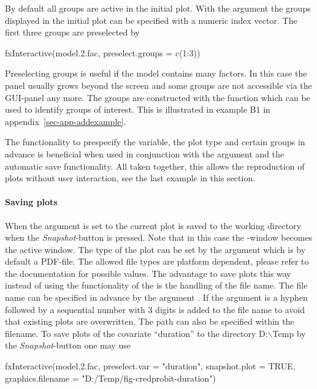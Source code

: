 \documentclass[nojss]{jss}
\newcommand{\quotes}[1]{``#1''}
\begin{document}
By default all groups are active in the initial plot. With the argument  the groups  displayed in the initial plot can be specified with a 
numeric index vector. The first three groups are preselected by
%
\begin{Schunk}
\begin{Sinput}
 fxInteractive(model.2.fac, preselect.groups = c(1:3))
\end{Sinput}
\end{Schunk}
%
Preselecting groups is useful if the model contains many factors. In this case the panel usually grows beyond the screen and some groups are not accessible via the GUI-panel any more. The groups are constructed with the function  which can be used to identify groups of interest. This is illustrated in example B1 in appendix~\ref{sec-app-addexample}. 

The functionality to prespecify the variable, the plot type and certain groups in advance is beneficial when used in conjunction with the argument  and the automatic save functionality. All taken together, this allows the reproduction of plots without user interaction, see the last example in this section.

\vspace{-0.3cm}\paragraph{Saving plots}
When the argument  is set to  the current plot is saved to the working directory when the \emph{Snapshot}-button is pressed. Note that in this case the -window becomes the active window. The type of the plot can be set by the argument  which is by default a PDF-file. The allowed file types are platform dependent, please refer to the documentation for possible values.  The advantage to save plots this way instead of using the functionality of the  is the handling of the file name.  The file name can be specified in advance  by the argument . If the argument  is  a hyphen followed by a sequential number with 3 digits is added to the file name to avoid that existing plots are overwritten. The path can also be specified within the filename. To save plots of the covariate \quotes{duration} to the directory D:$\backslash$Temp by the \emph{Snapshot}-button one may use
%
\begin{Schunk}
\begin{Sinput}
 fxInteractive(model.2.fac, 
     preselect.var     = "duration",
     snapshot.plot     = TRUE,
     graphics.filename = "D:/Temp/fig-credprobit-duration")
\end{Sinput}
\end{Schunk}
%
\end{document}
